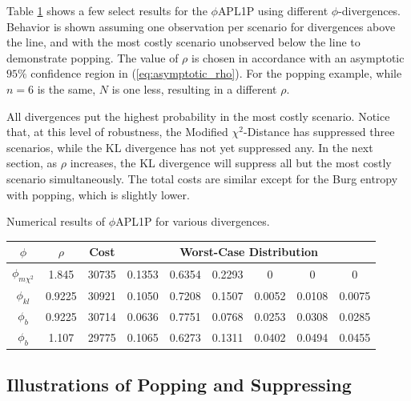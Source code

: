 \documentclass[opre,nonblindrev]{informs3} %
\begin{document}
Table \ref{tb:numerical_results} shows a few select results for the $\phi$APL1P using different $\phi$-divergences.  
Behavior is shown assuming one observation per scenario for divergences above the line, and with the most costly scenario unobserved below the line to demonstrate popping.
The value of $\rho$ is chosen in accordance with an asymptotic $95\%$ confidence region in (\ref{eq:asymptotic_rho}).
For the popping example, while $n=6$ is the same, $N$ is one less, resulting in a different $\rho$. 

All divergences put the highest probability in the most costly scenario. 
Notice that, at this level of robustness, the Modified $\chi^2$-Distance has suppressed three scenarios, while the KL divergence has not yet suppressed any.
In the next section, as $\rho$ increases, the KL divergence will suppress all but the most costly scenario simultaneously. 
The total costs are similar except for the Burg entropy with popping, which is slightly lower.


\begin{table}
	\TABLE
	{
		Numerical results of $\phi$APL1P for various divergences.
		\label{tb:numerical_results}
	}
	{\begin{tabular}{cc|c|cccccc}
		$\phi$ & $\rho$ & Cost & \multicolumn{6}{c}{Worst-Case Distribution} \\
		\hline
		$\phi_{m\chi^2}$ &  1.845  & 30735 & 0.1353 & 0.6354 & 0.2293 & 0      & 0      & 0 \\
		$\phi_{kl}$      &  0.9225 & 30921 & 0.1050 & 0.7208 & 0.1507 & 0.0052 & 0.0108 & 0.0075 \\
		$\phi_b$         &  0.9225 & 30714 & 0.0636 & 0.7751 & 0.0768 & 0.0253 & 0.0308 & 0.0285 \\
		\hline
		$\phi_b$         &  1.107  & 29775 & 0.1065 & 0.6273 & 0.1311 & 0.0402 & 0.0494 & 0.0455
	\end{tabular}}
	{}
\end{table}

\subsection{Illustrations of Popping and Suppressing}
\label{ssec:numerical_pop_suppress}


\end{document}

